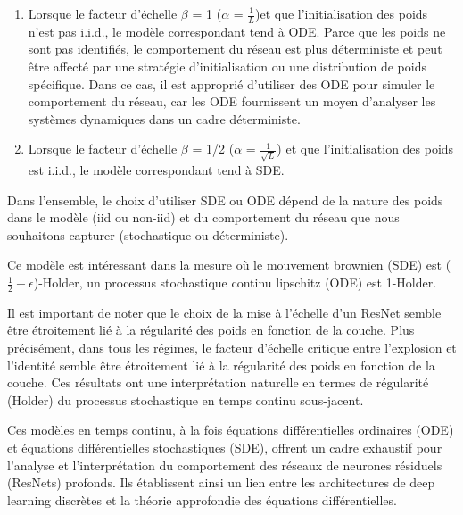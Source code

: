 \begin{enumerate}
    \item Lorsque le facteur d'échelle $\beta$ = 1 ($\alpha$ = $\frac{1}{L}$)et que l'initialisation des poids n'est pas i.i.d., le modèle correspondant tend à ODE.
    Parce que les poids ne sont pas identifiés, le comportement du réseau est plus déterministe et peut être affecté par une stratégie d'initialisation ou une distribution de poids spécifique. Dans ce cas, il est approprié d'utiliser des ODE pour simuler le comportement du réseau, car les ODE fournissent un moyen d'analyser les systèmes dynamiques dans un cadre déterministe.

    \item Lorsque le facteur d'échelle $\beta$ = 1/2 ($\alpha$ = $\frac{1}{\sqrt{L}}$) et que l'initialisation des poids est i.i.d., le modèle correspondant tend à SDE.
\end{enumerate}

Dans l'ensemble, le choix d'utiliser SDE ou ODE dépend de la nature des poids dans le modèle (iid ou non-iid) et du comportement du réseau que nous souhaitons capturer (stochastique ou déterministe).

Ce modèle est intéressant dans la mesure où le mouvement brownien (SDE) est ($\frac{1}{2}-\epsilon$)-Holder, un processus stochastique continu lipschitz (ODE) est 1-Holder.

Il est important de noter que le choix de la mise à l'échelle d'un ResNet semble être étroitement lié à la régularité des poids en fonction de la couche. Plus précisément, dans tous les régimes, le facteur d'échelle critique entre l'explosion et l'identité semble être étroitement lié à la régularité des poids en fonction de la couche. Ces résultats ont une interprétation naturelle en termes de régularité (Holder) du processus stochastique en temps continu sous-jacent.

Ces modèles en temps continu, à la fois équations différentielles ordinaires (ODE) et équations différentielles stochastiques (SDE), offrent un cadre exhaustif pour l'analyse et l'interprétation du comportement des réseaux de neurones résiduels (ResNets) profonds. Ils établissent ainsi un lien entre les architectures de deep learning discrètes et la théorie approfondie des équations différentielles.
